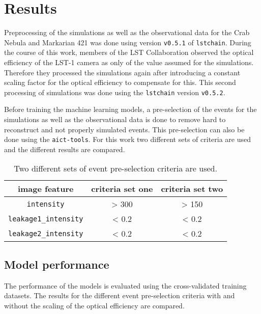 \chapter{Results}
\label{ch:results}
Preprocessing of the simulations as well as the observational data for the Crab Nebula and Markarian 421 was done using version \texttt{v0.5.1} of \texttt{lstchain}.
During the course of this work, members of the LST Collaboration observed the optical efficiency of the LST-1 camera as only  of the value assumed 
for the simulations.
Therefore they processed the simulations again after introducing a constant scaling factor for the optical efficiency to compensate for this.
This second processing of simulations was done using the \texttt{lstchain} version \texttt{v0.5.2}.

Before training the machine learning models, a pre-selection of the events for the simulations as well as the observational data is done to remove 
hard to reconstruct and not properly simulated events. 
This pre-selection can also be done using the \texttt{aict-tools}.
For this work two different sets of criteria are used and the different results are compared.
\begin{table}
    \centering
    \caption{Two different sets of event pre-selection criteria are used.}
    \begin{tabular}{c c c}
        \toprule
        image feature & criteria set one & criteria set two \\
        \midrule
        \texttt{intensity} & > 300 & > 150 \\
        \texttt{leakage1\_intensity} & < 0.2 & < 0.2 \\
        \texttt{leakage2\_intensity} & < 0.2 & < 0.2 \\
        \bottomrule
    \end{tabular}
\end{table}


\section{Model performance}
The performance of the models is evaluated using the cross-validated training datasets.
The results for the different event pre-selection criteria with and without the scaling of the optical efficiency are compared.


